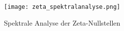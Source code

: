 \begin{figure}[h]
    \centering
    \texttt{[image: zeta\_spektralanalyse.png]}
    \caption{Spektrale Analyse der Zeta-Nullstellen}
\end{figure}